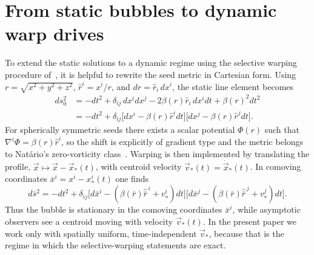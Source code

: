 \documentclass[11pt]{article}
\begin{document}
\section{From static bubbles to dynamic warp drives}
\label{sec:warp}
To extend the static solutions to a dynamic regime using the selective warping procedure of~\cite{Schuster:2023ADMmass}, it is helpful to rewrite the seed metric in Cartesian form. Using $r=\sqrt{x^2+y^2+z^2}$, $\hat r^i=x^i/r$, and $dr=\hat r_i\,dx^i$, the static line element becomes
\begin{equation}
\label{eq:zero-vorticity-line-revised}
\begin{aligned}
ds_0^2
&=-dt^2+\delta_{ij}\,dx^i dx^j-2\beta(r)\hat r_i\,dx^i dt+\beta(r)^2dt^2\\
&=-dt^2+\delta_{ij}\bigl[dx^i-\beta(r)\hat r^i dt\bigr]\bigl[dx^j-\beta(r)\hat r^j dt\bigr].
\end{aligned}
\end{equation}
For spherically symmetric seeds there exists a scalar potential $\Phi(r)$ such that $\nabla^i\Phi=\beta(r)\hat r^i$, so the shift is explicitly of gradient type and the metric belongs to Nat\'ario's zero-vorticity class~\cite{Natario:2001,Schuster:2023ADMmass}. Warping is then implemented by translating the profile, $\vec x\mapsto \vec x-\vec x_*(t)$, with centroid velocity $\vec v_*(t)=\dot{\vec x}_*(t)$. In comoving coordinates $\bar x^i=x^i-x_*^i(t)$ one finds
\begin{equation}
\label{eq:comoving-revised}
d\bar s^2=-dt^2+\delta_{ij}\Big[d\bar x^i-(\beta(\bar r)\hat{\bar r}^{\,i}+v_*^i)dt\Big]\Big[d\bar x^j-(\beta(\bar r)\hat{\bar r}^{\,j}+v_*^j)dt\Big].
\end{equation}
Thus the bubble is stationary in the comoving coordinates $\bar x^i$, while asymptotic observers see a centroid moving with velocity $\vec v_*(t)$. In the present paper we work only with spatially uniform, time-independent $\vec v_*$, because that is the regime in which the selective-warping statements are exact.
\end{document}
